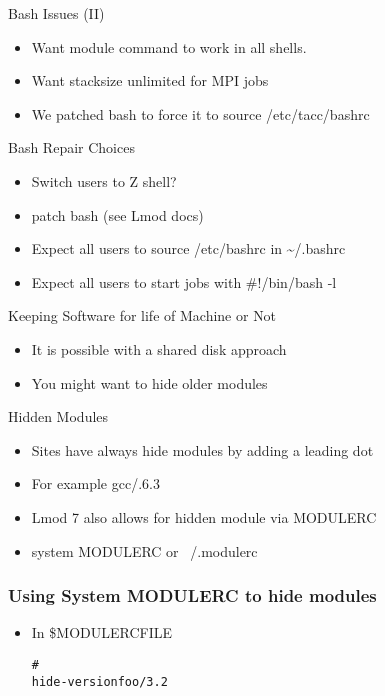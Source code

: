 \documentclass[dvipsnames,aspectratio=169]{beamer}
\begin{document}
\begin{frame}{Bash Issues (II)}
  \begin{itemize}
    \item Want module command to work in all shells.
    \item Want stacksize unlimited for MPI jobs
    \item We patched bash to force it to source /etc/tacc/bashrc
  \end{itemize}
\end{frame}

\begin{frame}{Bash Repair Choices}
  \begin{itemize}
    \item Switch users to Z shell?
    \item patch bash (see Lmod docs)
    \item Expect all users to source /etc/bashrc in \textasciitilde/.bashrc
    \item Expect all users to start jobs with \#!/bin/bash -l
  \end{itemize}
\end{frame}

\begin{frame}{Keeping Software for life of Machine or Not}
  \begin{itemize}
    \item It is possible with a shared disk approach
    \item You might want to hide older modules
  \end{itemize}
\end{frame}

\begin{frame}{Hidden Modules}
  \begin{itemize}
    \item Sites have always hide modules by adding a leading dot
    \item For example gcc/.6.3
    \item Lmod 7 also allows for hidden module via MODULERC
    \item system MODULERC or ~/.modulerc
  \end{itemize}
\end{frame}

\begin{frame}[fragile]
    \frametitle{Using System MODULERC to hide modules}
  \begin{itemize}
    \item In \$MODULERCFILE
  {\small
    \begin{alltt}
        #%Module
        hide-version foo/3.2
    \end{alltt}
}
  \end{itemize}
\end{frame}
\end{document}

